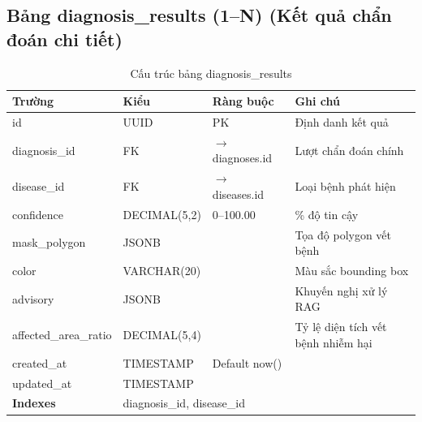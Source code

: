 \documentclass[12pt,a4paper]{article}
\begin{document}
\subsection{Bảng diagnosis\_results (1--N) (Kết quả chẩn đoán chi tiết)}
\begin{longtable}{|l|l|l|p{5.5cm}|}
    \caption{Cấu trúc bảng diagnosis\_results}                                                                                                \\
    \hline
    \rowcolor{headerblue}
    \textbf{Trường}       & \textbf{Kiểu}                                   & \textbf{Ràng buộc}         & \textbf{Ghi chú}                   \\
    \hline
    id                    & UUID                                            & PK                         & Định danh kết quả                  \\
    \hline
    diagnosis\_id         & FK                                              & $\rightarrow$ diagnoses.id & Lượt chẩn đoán chính               \\
    \hline
    disease\_id           & FK                                              & $\rightarrow$ diseases.id  & Loại bệnh phát hiện                \\
    \hline
    confidence            & DECIMAL(5,2)                                    & 0--100.00                  & \% độ tin cậy                      \\
    \hline
    mask\_polygon         & JSONB                                           &                            & Tọa độ polygon vết bệnh            \\
    \hline
    color                 & VARCHAR(20)                                     &                            & Màu sắc bounding box               \\
    \hline
    advisory              & JSONB                                           &                            & Khuyến nghị xử lý RAG              \\
    \hline
    affected\_area\_ratio & DECIMAL(5,4)                                    &                            & Tỷ lệ diện tích vết bệnh nhiễm hại \\
    \hline
    created\_at           & TIMESTAMP                                       & Default now()              &                                    \\
    \hline
    updated\_at           & TIMESTAMP                                       &                            &                                    \\
    \hline
    \rowcolor{headerblue}
    \textbf{Indexes}      & \multicolumn{3}{l|}{diagnosis\_id, disease\_id}                                                                   \\
    \hline
\end{longtable}
\end{document}
